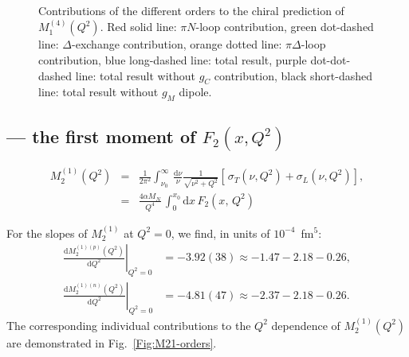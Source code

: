 \documentclass[12pt,preprint,tightenlines,
showpacs,preprintnumbers,amsmath,amssymb,
a4paper,nofootinbib]{revtex4-1}
\def\bea{\begin{eqnarray}}
\def\eea{\end{eqnarray}}
\def\al{\alpha}
\def\nn{\nonumber}
\def\dd{\mathrm{d}}
\begin{document}
\begin{figure}
\begin{center}
\caption{\small{Contributions of the different orders to the chiral prediction of $M_1^{(4)}(Q^2)$. Red solid line: $\pi N$-loop contribution, green dot-dashed line: $\Delta$-exchange contribution, orange dotted line: $\pi \Delta$-loop contribution, blue long-dashed line: total result, purple dot-dot-dashed line: total result without $g_C$ contribution, black short-dashed line: total result without $g_M$ dipole.}\label{Fig:M14-orders}}
\end{center}
\end{figure}

\subsection{ --- the first moment of $F_2(x,Q^2)$}

\bea
M^{(1)}_2(Q^2)  &=& \frac{1}{2 \pi^2}  \int_{\nu_0}^{\infty}\, 
\frac{\mathrm{d}\nu}{\nu}  
\frac{1}{\sqrt{\nu^{2}+Q^2}}\left[ \frac{}{} \sigma_T(\nu, Q^2 ) +  \sigma_L(\nu, Q^2 )\right],   
\label{eq:m21}\\
&=&\frac{4 \al M_N}{ Q^4}\,\int_{0}^{x_0} \mathrm{d}x  \,F_2(x,\,Q^2) 
\nn 
\eea 

For the slopes of $M_2^{(1)}$ at $Q^2=0$, we find, in units of $10^{-4}$~fm$^5$:
\begin{align}
\left.\frac{\dd M_2^{(1)(p)} (Q^2)}{\dd Q^2}\right|_{Q^2=0}&= -3.92(38)\approx -1.47-2.18-0.26 ,  \\
\left.\frac{\dd M_2^{(1)(n)} (Q^2)}{\dd Q^2}\right|_{Q^2=0}&=-4.81(47) \approx -2.37-2.18-0.26 .
\end{align}
 The corresponding individual contributions to the $Q^2$ dependence
of $M_2^{(1)}(Q^2)$ are demonstrated in Fig.~\ref{Fig:M21-orders}.
\end{document}
